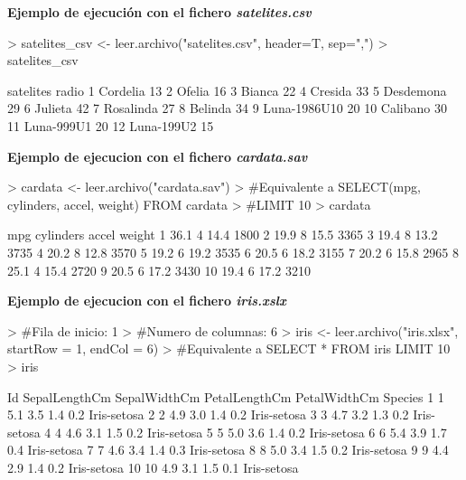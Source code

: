 \documentclass [a4paper] {article}
\begin{document}
\hfil \textbf{Ejemplo de ejecución con el fichero \textit{satelites.csv}} \par
\begin{Schunk}
\begin{Sinput}
> satelites_csv <- leer.archivo("satelites.csv", header=T, sep=",")
> satelites_csv
\end{Sinput}
\begin{Soutput}
      satelites radio
1      Cordelia    13
2        Ofelia    16
3        Bianca    22
4       Cresida    33
5     Desdemona    29
6       Julieta    42
7     Rosalinda    27
8       Belinda    34
9  Luna-1986U10    20
10     Calibano    30
11   Luna-999U1    20
12   Luna-199U2    15
\end{Soutput}
\end{Schunk}
\newpage
\hfil \textbf{Ejemplo de ejecucion con el fichero \textit{cardata.sav}} \par
\begin{Schunk}
\begin{Sinput}
> cardata <- leer.archivo("cardata.sav")
> #Equivalente a SELECT(mpg, cylinders, accel, weight) FROM cardata
> #LIMIT 10
> cardata %>% select(mpg, cylinders, accel, weight) %>% head(10)
\end{Sinput}
\begin{Soutput}
    mpg cylinders accel weight
1  36.1         4  14.4   1800
2  19.9         8  15.5   3365
3  19.4         8  13.2   3735
4  20.2         8  12.8   3570
5  19.2         6  19.2   3535
6  20.5         6  18.2   3155
7  20.2         6  15.8   2965
8  25.1         4  15.4   2720
9  20.5         6  17.2   3430
10 19.4         6  17.2   3210
\end{Soutput}
\end{Schunk}

\hfil \textbf{Ejemplo de ejecucion con el fichero \textit{iris.xslx}}
\begin{Schunk}
\begin{Sinput}
> #Fila de inicio: 1
> #Numero de columnas: 6
> iris <- leer.archivo("iris.xlsx", startRow = 1, endCol = 6)
> #Equivalente a SELECT * FROM iris LIMIT 10
> iris %>% head(10)
\end{Sinput}
\begin{Soutput}
   Id SepalLengthCm SepalWidthCm PetalLengthCm PetalWidthCm     Species
1   1           5.1          3.5           1.4          0.2 Iris-setosa
2   2           4.9          3.0           1.4          0.2 Iris-setosa
3   3           4.7          3.2           1.3          0.2 Iris-setosa
4   4           4.6          3.1           1.5          0.2 Iris-setosa
5   5           5.0          3.6           1.4          0.2 Iris-setosa
6   6           5.4          3.9           1.7          0.4 Iris-setosa
7   7           4.6          3.4           1.4          0.3 Iris-setosa
8   8           5.0          3.4           1.5          0.2 Iris-setosa
9   9           4.4          2.9           1.4          0.2 Iris-setosa
10 10           4.9          3.1           1.5          0.1 Iris-setosa
\end{Soutput}
\end{Schunk}
\end{document}
